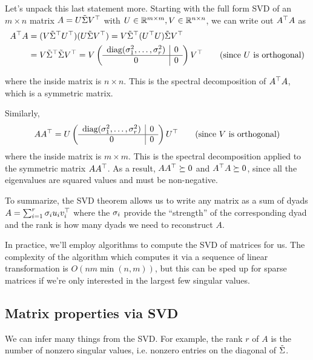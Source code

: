 \documentclass[11 pt]{scrartcl}
\begin{document}
Let's unpack this last statement more. 
Starting with the full form SVD of an $m\times n$ matrix $A = U \tilde{\Sigma} V^\top$ with $U\in \mathbb R^{m\times m}, V\in\mathbb R^{n\times n}$, we can write out $A^\top A$ as 
\begin{align*}
    A^\top A &= (V \tilde{\Sigma}^\top U^\top) (U \tilde{\Sigma} V^\top) =  V \tilde{\Sigma}^\top (U^\top U) \tilde{\Sigma} V^\top \\ 
           &= V\tilde{\Sigma}^\top \tilde{\Sigma} V^\top = V \left(\begin{array}{c|c} \text{diag}(\sigma_1^2, \dots, \sigma_r^2) & 0 \\ \hline 0 & 0 \end{array}\right) V^\top \tag{since $U$ is orthogonal}
\end{align*}

where the inside matrix is $n\times n$. 
This is the spectral decomposition of $A^\top A$, which is a symmetric matrix. 

Similarly, 
\begin{align*}
    A A^\top = U \left(\begin{array}{c|c} \text{diag}(\sigma_1^2, \dots, \sigma_r^2) & 0 \\ \hline 0 & 0 \end{array}\right) U^\top \tag{since $V$ is orthogonal}
\end{align*}
where the inside matrix is $m\times m$. 
This is the spectral decomposition applied to the symmetric matrix $AA^\top$. 
As a result, $AA^\top \succeq 0$ and $A^\top A \succeq 0$, since all the eigenvalues are squared values and must be non-negative.

To summarize, the SVD theorem allows us to write any matrix as a sum of dyads $A = \sum_{i=1}^r \sigma_i u_i v_i^\top$ where the $\sigma_i$ provide the ``strength'' of the corresponding dyad and the rank is how many dyads we need to reconstruct $A$. 

In practice, we'll employ algorithms to compute the SVD of matrices for us.
The complexity of the algorithm which computes it via a sequence of linear transformation is $O(nm\min(n,m))$, but this can be sped up for sparse matrices if we're only interested in the largest few singular values. 

\subsection{Matrix properties via SVD}
We can infer many things from the SVD. 
For example, the rank $r$ of $A$ is the number of nonzero singular values, i.e. nonzero entries on the diagonal of $\tilde{\Sigma}$. 
\end{document}
